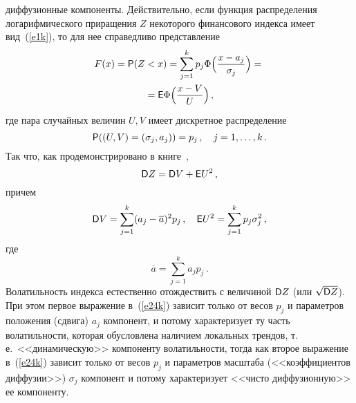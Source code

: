 \begin{multicols}{2}
\begin{enumerate}[($i$)]
диффузионные компоненты. Действительно,\linebreak 
если функция распределения
логарифмического приращения $Z$ некоторого финансового индекса
имеет вид~(\ref{e1k}), то для нее справедливо пред\-став\-ле\-ние
\begin{multline*}
F(x)={\sf
P}(Z<x)=\sum_{j=1}^kp_j\Phi\Big(\displaystyle\frac{\displaystyle x-a_j\mathstrut}{\displaystyle \sigma_j\mathstrut}\Big)={}\\
{}={\sf
E}\Phi\Big(\displaystyle\frac{\displaystyle x-V\mathstrut}{\displaystyle U\mathstrut}\Big)\,,
\end{multline*}
где пара случайных величин $U,V$
имеет дискретное распределение
$$
{\sf P}((U,V)=(\sigma_j,a_j))=p_j\,,\quad  j=1,\ldots,k\,.
$$
Так что, как
продемонстрировано в книге~\cite{2k},
\begin{equation}
{\sf D}Z={\sf D}V+{\sf E}U^2\,,\label{e23k}
\end{equation}
причем
\begin{equation}
{\sf D}V=\sum_{j=1}^k(a_j-\overline
a)^2p_j\,,\quad {\sf E}U^2=\sum_{j=1}^kp_j\sigma_j^2\,,\label{e24k}
\end{equation}
где
$$
\overline a=\sum_{j=1}^ka_jp_j\,.
$$
Волатильность индекса
естественно отождествить с величиной ${\sf D}Z$ (или $\sqrt{{\sf
D}Z}$). При этом первое выражение в~(\ref{e24k}) зависит только от весов
$p_j$ и параметров положения (сдвига) $a_j$ компонент, и потому
характеризует ту часть волатильности, которая обусловлена наличием
локальных трендов, т.\,е.\ <<динамическую>> компоненту
волатильности, тогда как второе выражение в~(\ref{e24k}) зависит только от
весов $p_j$ и параметров масштаба (<<коэффициентов диффузии>>)
$\sigma_j$ компонент и потому характеризует <<чисто диффузионную>>
ее компоненту.


\end{enumerate}
\end{multicols}
